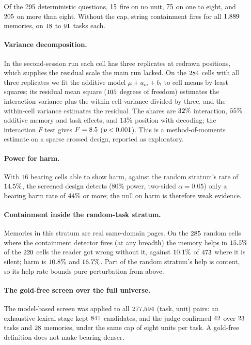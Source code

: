 Of the 295 deterministic questions, $15$ fire on no unit, $75$
on one to eight, and $205$ on more than eight. Without the cap, string
containment fires for all $1{,}889$ memories, on $18$ to
$91$ tasks each.

\paragraph{Variance decomposition.} In the second-session run each cell has three
replicates at redrawn positions, which supplies the residual scale the main run
lacked. On the $284$ cells with all three replicates we fit the additive
model $\mu + a_m + b_t$ to cell means by least squares; its residual mean square
($105$ degrees of freedom) estimates the interaction variance plus the
within-cell variance divided by three, and the within-cell variance estimates the
residual. The shares are $32\%$ interaction, $55\%$ additive
memory and task effects, and $13\%$ position with decoding; the
interaction $F$ test gives $F=8.5$ ($p<0.001$). This is a method-of-moments
estimate on a sparse crossed design, reported as exploratory.

\paragraph{Power for harm.} With $16$ bearing cells able to show harm, against
the random stratum's rate of $14.5\%$, the screened design detects
(80\% power, two-sided $\alpha=0.05$) only a bearing harm rate of
$44\%$ or more; the null on harm is therefore weak evidence.

\paragraph{Containment inside the random-task stratum.} Memories in this stratum are real
same-domain pages. On the $285$ random cells where the containment
detector fires (at any breadth) the memory helps in $15.5\%$ of the
$220$ cells the reader got wrong without it, against
$10.1\%$ of $473$ where it is silent; harm is
$10.8\%$ and $16.7\%$. Part of the random stratum's help
is content, so its help rate bounds pure perturbation from above.

\paragraph{The gold-free screen over the full universe.} The model-based screen
was applied to all $277{,}594$ (task, unit) pairs: an exhaustive lexical
stage kept $841$ candidates, and the judge confirmed $42$ over
$23$ tasks and $28$ memories, under the same cap of eight units
per task. A gold-free definition does not make bearing denser.


